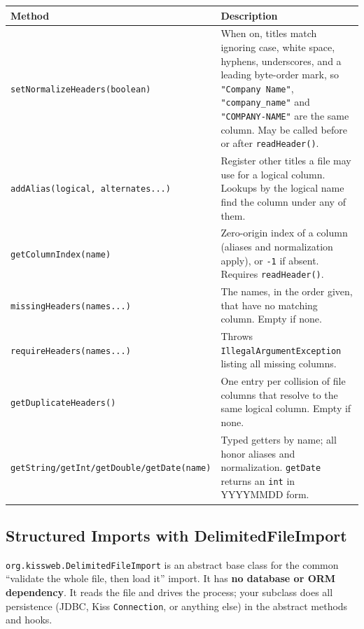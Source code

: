 \begin{longtable}{P{5.0cm}P{5.5cm}}
\toprule
\textbf{Method} & \textbf{Description} \\
\midrule
\endhead
\texttt{setNormalizeHeaders(}\allowbreak\texttt{boolean)} & When on, titles match ignoring case, white space, hyphens, underscores, and a leading byte-order mark, so \texttt{"Company Name"}, \texttt{"company\_name"} and \texttt{"COMPANY-NAME"} are the same column.  May be called before or after \texttt{readHeader()}. \\
\texttt{addAlias(logical,}\allowbreak\ \texttt{alternates...)} & Register other titles a file may use for a logical column.  Lookups by the logical name find the column under any of them. \\
\texttt{getColumnIndex(name)} & Zero-origin index of a column (aliases and normalization apply), or \texttt{-1} if absent.  Requires \texttt{readHeader()}. \\
\texttt{missingHeaders(}\allowbreak\texttt{names...)} & The names, in the order given, that have no matching column.  Empty if none. \\
\texttt{requireHeaders(}\allowbreak\texttt{names...)} & Throws \texttt{IllegalArgumentException} listing all missing columns. \\
\texttt{getDuplicateHeaders()} & One entry per collision of file columns that resolve to the same logical column.  Empty if none. \\
\texttt{getString/}\allowbreak\texttt{getInt/}\allowbreak\texttt{getDouble/}\allowbreak\texttt{getDate(name)} & Typed getters by name; all honor aliases and normalization.  \texttt{getDate} returns an \texttt{int} in YYYYMMDD form. \\
\bottomrule
\end{longtable}

\subsection{Structured Imports with DelimitedFileImport}
\label{sec:file-csv-import}

\texttt{org.kissweb.DelimitedFileImport} is an abstract base class for the common ``validate the whole file, then load it'' import.  It has \textbf{no database or ORM dependency}.  It reads the file and drives the process; your subclass does all persistence (JDBC, Kiss \texttt{Connection}, or anything else) in the abstract methods and hooks.

